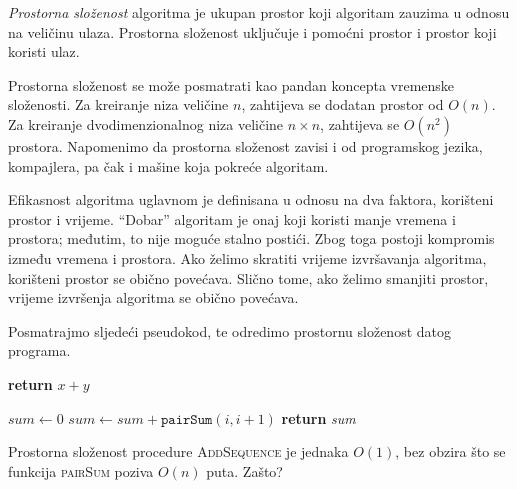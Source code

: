  \textit{Prostorna složenost} algoritma je ukupan prostor koji algoritam zauzima u odnosu na veličinu ulaza. Prostorna složenost   uključuje i pomoćni prostor i prostor koji koristi ulaz.
 
 Prostorna složenost se može posmatrati kao pandan koncepta vremenske složenosti. Za kreiranje niza veličine $n$, zahtijeva se dodatan prostor od $O(n)$. Za kreiranje dvodimenzionalnog niza veličine $n \times n$,  zahtijeva se $O(n^2)$ prostora.
 Napomenimo da prostorna složenost zavisi i od programskog jezika, kompajlera, pa  čak i mašine koja pokreće algoritam.
 
 
 Efikasnost algoritma uglavnom je definisana u odnosu na  dva faktora, korišteni prostor i vrijeme. ``Dobar'' algoritam je onaj koji koristi manje vremena i prostora; međutim, to nije moguće stalno postići. Zbog toga postoji kompromis između vremena i prostora. Ako želimo skratiti vrijeme izvršavanja algoritma, korišteni prostor se obično povećava. Slično tome, ako želimo smanjiti prostor, vrijeme izvršenja algoritma se obično povećava. %
 
 
 \begin{example}
 	Posmatrajmo sljedeći pseudokod, te odredimo prostornu složenost datog 
 	programa. 
 	
 	
 	\begin{algorithm}[H]
 		\begin{algorithmic}[1]
 			\State	\textbf{return} $x+y$
 			\EndProcedure
 			
 		\end{algorithmic}
 	\end{algorithm}        
 	
 	
 	\begin{algorithm}[H]
 		\begin{algorithmic}[1]
 			
 			\State $sum \gets 0$
 			\State $sum \gets sum + \texttt{pairSum}(i, i+1)$
 			\EndFor
 			\State \textbf{return} \textit{sum}~
 			\EndProcedure
 			
 		\end{algorithmic}
 	\end{algorithm}
 	
 	Prostorna složenost procedure \textsc{AddSequence} je jednaka $O(1)$, bez obzira što se funkcija \textsc{pairSum} poziva $O(n)$ puta. Zašto?
 	
 	
 \end{example}
 
